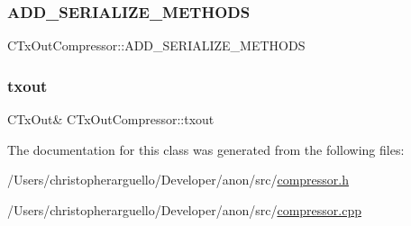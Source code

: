 \subsubsection{\texorpdfstring{A\+D\+D\+\_\+\+S\+E\+R\+I\+A\+L\+I\+Z\+E\+\_\+\+M\+E\+T\+H\+O\+DS}{ADD\_SERIALIZE\_METHODS}}
{\footnotesize\ttfamily C\+Tx\+Out\+Compressor\+::\+A\+D\+D\+\_\+\+S\+E\+R\+I\+A\+L\+I\+Z\+E\+\_\+\+M\+E\+T\+H\+O\+DS}

\mbox{\label{class_c_tx_out_compressor_a0cc5b4e0d80df37dcaa706624eddc2f1}} 
\subsubsection{\texorpdfstring{txout}{txout}}
{\footnotesize\ttfamily C\+Tx\+Out\& C\+Tx\+Out\+Compressor\+::txout\hspace{0.3cm}{\ttfamily [private]}}



The documentation for this class was generated from the following files\+:\begin{DoxyCompactItemize}
\item 
/\+Users/christopherarguello/\+Developer/anon/src/\mbox{\hyperlink{compressor_8h}{compressor.\+h}}\item 
/\+Users/christopherarguello/\+Developer/anon/src/\mbox{\hyperlink{compressor_8cpp}{compressor.\+cpp}}\end{DoxyCompactItemize}
